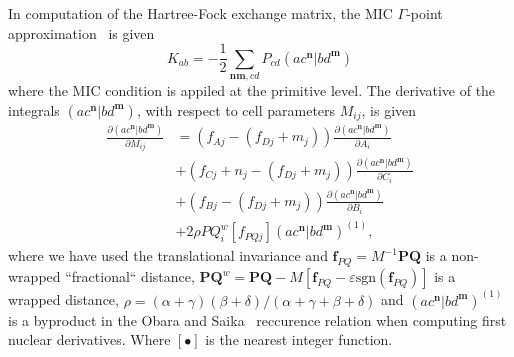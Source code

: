 \documentclass[pra,aps,twocolumn,showkeys,twocolumngrid,superbib]{revtex4}
\def\n{\mathbf{n}}
\def\m{\mathbf{m}}
\begin{document}


In computation of the Hartree-Fock exchange matrix, 
the MIC $\Gamma$-point approximation~\cite{CTymczak03b}
is given 
\begin{equation}
  K_{ab}= -\frac{1}{2}\sum_{\n\m,cd}P_{cd}(ac^\n|bd^\m)
\end{equation}
where the MIC condition is appiled at the primitive level.
The derivative of the integrals $(ac^\n|bd^\m)$, with respect 
to cell parameters $M_{ij}$, is given
\begin{equation}
  \begin{split}
    \frac{\partial (ac^\n|bd^\m)}{\partial M_{ij}}
    &=(f_{Aj}-(f_{Dj}+m_j))\frac{\partial (ac^\n|bd^\m)}{\partial A_{i}}\\
    &+(f_{Cj}+n_j-(f_{Dj}+m_j))\frac{\partial (ac^\n|bd^\m)}{\partial C_{i}}\\
    &+(f_{Bj}-(f_{Dj}+m_j))\frac{\partial (ac^\n|bd^\m)}{\partial B_{i}}\\
    &+2\rho PQ_i^{w}[f_{PQj}] (ac^\n|bd^\m)^{(1)},
  \end{split}
\end{equation}
where we have used the translational invariance and 
$\mathbf{f}_{PQ}=M^{-1}\mathbf{PQ}$
is a non-wrapped ``fractional`` distance, 
$\mathbf{PQ}^{w}=\mathbf{PQ}-M[\mathbf{f}_{PQ}-\varepsilon \mathrm{sgn}(\mathbf{f}_{PQ})]$ 
is a wrapped distance, 
$\rho=(\alpha+\gamma)(\beta+\delta)/(\alpha+\gamma+\beta+\delta)$ and 
$(ac^\n|bd^\m)^{(1)}$ is a byproduct in the Obara and Saika~\cite{SObara86} 
reccurence relation when computing first nuclear derivatives.
Where $[\bullet]$ is the nearest integer function.
\end{document}
